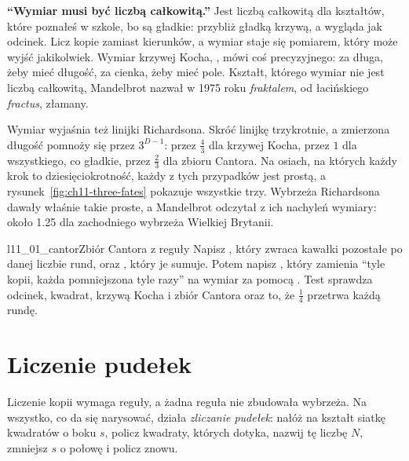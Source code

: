\begin{trapbox}
\textbf{\enquote{Wymiar musi być liczbą całkowitą.}} Jest liczbą całkowitą
dla kształtów, które poznałeś w szkole, bo są gładkie: przybliż gładką
krzywą, a wygląda jak odcinek. Licz kopie zamiast kierunków, a wymiar staje
się pomiarem, który może wyjść jakikolwiek. Wymiar krzywej Kocha,
, mówi coś precyzyjnego: za długa, żeby mieć długość, za cienka, żeby
mieć pole. Kształt, którego wymiar nie jest liczbą całkowitą, Mandelbrot
nazwał w 1975 roku \emph{fraktalem}, od łacińskiego \emph{fractus},
złamany.
\end{trapbox}

\noindent
Wymiar wyjaśnia też linijki Richardsona. Skróć linijkę trzykrotnie, a
zmierzona długość pomnoży się przez $3^{D - 1}$: przez $\tfrac{4}{3}$ dla
krzywej Kocha, przez $1$ dla wszystkiego, co gładkie, przez $\tfrac{2}{3}$
dla zbioru Cantora. Na osiach, na których każdy krok to dziesięciokrotność,
każdy z tych przypadków jest prostą, a rysunek~\ref{fig:ch11-three-fates}
pokazuje wszystkie trzy. Wybrzeża Richardsona dawały właśnie takie proste,
a Mandelbrot odczytał z ich nachyleń wymiary: około \num{1.25} dla
zachodniego wybrzeża Wielkiej Brytanii.


\begin{lab}{l11_01_cantor}{Zbiór Cantora z reguły}
Napisz , który zwraca kawałki pozostałe po danej liczbie rund,
oraz , który je sumuje. Potem napisz
, który zamienia \enquote{tyle kopii, każda
pomniejszona tyle razy} na wymiar za pomocą . Test sprawdza
odcinek, kwadrat, krzywą Kocha i zbiór Cantora oraz to, że $\tfrac{1}{4}$
przetrwa każdą rundę.
\end{lab}

\section{Liczenie pudełek}
\label{sec:ch11-boxes}

\noindent
Liczenie kopii wymaga reguły, a żadna reguła nie zbudowała wybrzeża. Na
wszystko, co da się narysować, działa \emph{zliczanie pudełek}: nałóż na
kształt siatkę kwadratów o boku $s$, policz kwadraty, których dotyka, nazwij
tę liczbę $N$, zmniejsz $s$ o połowę i policz znowu.

